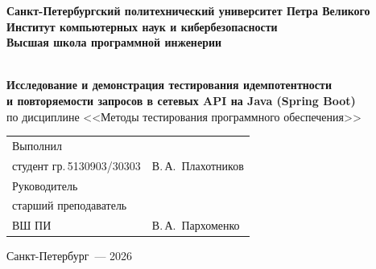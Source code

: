 \begin{titlepage}
\begin{center}

\textbf{Санкт-Петербургский политехнический университет Петра Великого}\\
\textbf{Институт компьютерных наук и кибербезопасности}\\
\textbf{Высшая школа программной инженерии}

\vfill

{\Large {}}\\[10mm]

{\textbf{Исследование и демонстрация тестирования идемпотентности\\
и повторяемости запросов в сетевых API на Java (Spring Boot)}}\\[3mm]

по дисциплине <<Методы тестирования программного обеспечения>>

\end{center}

\vspace{20mm}

\noindent
\begin{tabular}{@{}p{}@{}p{}@{}}
Выполнил & \\
студент гр.\,5130903/30303 & \hfill В.\,А.~Плахотников \\[4mm]
Руководитель & \\
старший преподаватель & \\
ВШ ПИ & \hfill В.\,А.~Пархоменко \\
\end{tabular}

\vfill

\begin{center}
Санкт-Петербург~--- 2026
\end{center}

\end{titlepage}
